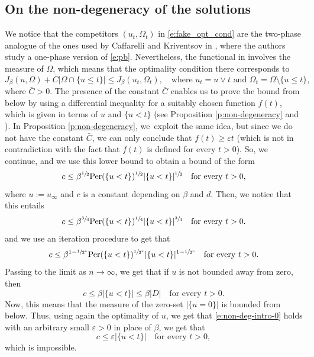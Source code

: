 \documentclass[JEP,XML,SOM,Unicode]{cedram}
\newcommand{\Per}{\mathrm{Per}}
\theoremstyle{plain}
\theoremstyle{definition}
\let\eps\varepsilon
\begin{document}
\subsection{On the non-degeneracy of the solutions}
We notice that the competitors $(u_t,\Omega_t)$ in \eqref{e:fake_opt_cond} are the two-phase analogue of the ones used by Caffarelli and Kriventsov in \cite{ck}, where the authors study a one-phase version of \eqref{e:pb}. Nevertheless, the functional in \cite{ck} involves the measure of $\Omega$, which means that the optimality condition there corresponds to
\begin{equation*}
J_\beta(u,\Omega)+\overline C|\Omega\cap\{u\le t\}|\le J_\beta(u_t,\Omega_t),\quad\text{where } u_t=u\vee t\text{ and } \Omega_t=\Omega\setminus \{u\le t\},
\end{equation*}
where $\bar C>0$. The presence of the constant $\bar C$ enables us to prove the bound from below by using a differential inequality for a suitably chosen function $f(t)$, which is given in terms of $u$ and $\{u<t\}$ (see Proposition \ref{p:non-degeneracy} and \cite[Th.\,3.2]{ck}). In Proposition \ref{p:non-degeneracy}, we~exploit the same idea, but since we do not have the constant $\bar C$, we can only conclude that $f(t)\ge \eps t$ (which is not in contradiction with the fact that $f(t)$ is defined for every $t>0$). So, we continue, and we use this lower bound to obtain a bound of the form
\begin{equation}\label{e:non-deg-intro-0}
c\le \beta^{\sfrac12}\Per(\{u<t\})^{\sfrac12}|\{u<t\}|^{\sfrac12}\quad\text{for every } t>0,
\end{equation}
where $u:=u_\infty$ and $c$ is a constant depending on $\beta$ and $d$. Then, we notice that this entails
\[c\le \beta^{\sfrac34}\Per(\{u<t\})^{\sfrac14}|\{u<t\}|^{\sfrac34}\quad\text{for every } t>0.\]
and we use an iteration procedure to get that
\[c\le \beta^{1-\sfrac1{2^n}}\Per(\{u<t\})^{\sfrac1{2^n}}|\{u<t\}|^{1-\sfrac1{2^n}}\quad\text{for every } t>0.\]
Passing to the limit as $n\to\infty$, we get that if $u$ is not bounded away from zero, then
\begin{equation}\label{e:non-deg-intro}
c\le \beta |\{u<t\}|\le\beta |D|\quad\text{for every } t>0.
\end{equation}
Now, this means that the measure of the zero-set $|\{u=0\}|$ is bounded from below. Thus, using again the optimality of $u$, we get that \eqref{e:non-deg-intro-0} holds with an arbitrary small $\eps>0$ in place of $\beta$, we get that
\begin{equation*}
c\le \eps |\{u<t\}|\quad\text{for every } t>0,
\end{equation*}
which is impossible.
\end{document}
